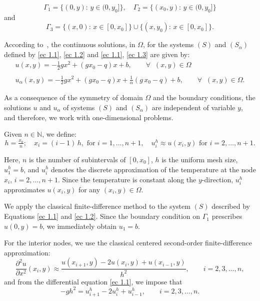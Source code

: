 \documentclass[axioms,article,submit,moreauthors]{Definitions/mdpi}
\begin{document}
     \[\Gamma_1= \{(0,y):\, y\in (0,y_0]\}, \quad \Gamma_2= \{(x_0,y):\, y\in (0,y_0]\} \]
      and
 \[ \Gamma_3= \{(x,0):\, x\in [0,x_0]\} \cup \{(x,y_0):\, x\in [0,x_0]\}.\]
    
According to~\cite{BoGaTa2020}, the continuous solutions, in $\Omega$, for the systems $(S)$ and $(S_\alpha)$ defined by \eqref{ec 1.1}, \eqref{ec 1.2}
and \eqref{ec 1.1}, \eqref{ec 1.3} are given by:
\begin{equation}\label{Def: u y ualpha}
\begin{array}{ll}
 u (x, y) = -\tfrac{1}{2} g x^2 + (g x_0 - q) x +b, \qquad \forall \;\; (x,y) \in \Omega   \\ 
 \\
 u_\alpha (x, y)= -\tfrac{1}{2} g x^2 + (g x_0 - q) x + \tfrac{1}{\alpha} (g\,x_0 - q) +b ,\qquad \forall \;\; (x,y) \in \Omega. 
 \end{array}
 \end{equation}

 
As 
a consequence of the symmetry of domain $\Omega$ {and the boundary conditions},  the solutions $u$ and $u_\alpha$ of systems $(S)$ and $(S_\alpha)$ are independent of variable $y$, and therefore, we  work  with one-dimensional problems.
      

      
      Given $n \in \mathbb{N}$, we define:
          \begin{equation} \label{ec 2.1}
    	    h= \tfrac{x_0}{n}; \quad x_i = (i-1) \,h, \text{ for } i=1,\ldots, n+1, \quad {u^h_i} \approx  u(x_i, y)  \text{ for } i=2, \ldots,n+1.
          \end{equation}
    
        
 {
Here, $n$ is the number of subintervals of $[0,x_0]$, $h$ is the uniform mesh size, $u^h_1=b$, and $u^h_i$ denotes the discrete approximation of the temperature at the node $x_i$, $i=2,\ldots,n+1$. Since the temperature is constant along the $y$-direction, $u^h_i$ approximates $u(x_i,y)$ for any $(x_i,y)\in\Omega$.
}

We apply the classical finite-difference method to the system $(S)$ described by \mbox{Equations} \eqref{ec 1.1} and \eqref{ec 1.2}.
Since the boundary condition on $\Gamma_1$ prescribes $u(0,y)=b$, we immediately obtain $u_1=b$.

For the interior nodes, we use the classical centered second-order finite-difference approximation:
\begin{equation}\label{aprox-deriv}
\frac{\partial^2 u}{\partial x^2}(x_i,y)\approx 
\frac{u(x_{i+1},y)-2u(x_i,y)+u(x_{i-1},y)}{h^2},
\qquad i=2,3,\ldots,n,
\end{equation}
and from {the differential equation} \eqref{ec 1.1}, {we impose that}
\begin{equation}\label{aprox-nodo-interior}
-gh^{2}= {u^h_{i+1}}-2{u^h_i}+{u^h_{i-1}},
\qquad i=2,3,\ldots,n.
\end{equation}
\end{document}
